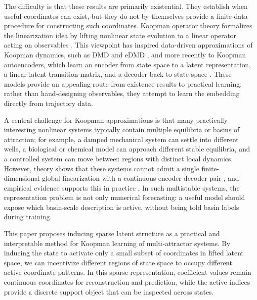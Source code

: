 \documentclass[11pt]{article}
\theoremstyle{plain}
\theoremstyle{definition}
\begin{document}
The difficulty is that these results are primarily existential.
They establish when useful coordinates can exist, but they do not by themselves provide a finite-data procedure for constructing such coordinates.
Koopman operator theory formalizes the linearization idea by lifting nonlinear
state evolution to a linear operator acting on observables \citep{koopman_hamiltonian_1931, koopman_dynamical_1932, mezic2005spectral, brunton_modern_2022}.
This viewpoint has inspired data-driven approximations of Koopman dynamics, such as DMD and eDMD \citep{schmid_dmd_2010, williams_datadriven_2015, williams_kernel-based_2016},
and more recently to Koopman autoencoders, which learn an encoder from state space to a latent representation, a linear latent transition matrix, and a decoder back to state space \citep{takeishi2017learning,lusch_deep_2018,otto2019linearly, azencot_forecasting_2020, shi_deep_2022, fathi2024course}.
These models provide an appealing route from existence results to practical learning: rather than hand-designing observables, they attempt to learn the embedding directly from trajectory data.

A central challenge for Koopman approximations is that many practically interesting nonlinear systems typically contain multiple equilibria or basins of attraction; for example, a damped mechanical system can settle into different wells, a biological or chemical model can approach different stable equilibria, and a controlled system can move between regions with distinct local dynamics. However, theory shows that these systems cannot admit a single finite-dimensional global linearization with a continuous encoder-decoder pair \citep{lan_linearization_2013, brunton_koopman_2016, pan_lifting_2024,liu_properties_2025}, and empirical evidence supports this in practice \citep{fathi2024course}.
In such multistable systems, the representation problem is not only numerical forecasting: a useful model should expose which basin-scale description is active, without being told basin labels during training.

This paper proposes inducing sparse latent structure as a practical and interpretable method for Koopman learning of multi-attractor systems.
By inducing the state to activate only a small subset of coordinates in lifted latent space, we can incentivize different regions of state space to occupy different active-coordinate patterns.
In this sparse representation, coefficient values remain continuous coordinates for reconstruction and prediction, while the active indices provide a discrete support object that can be inspected across states.
\end{document}
